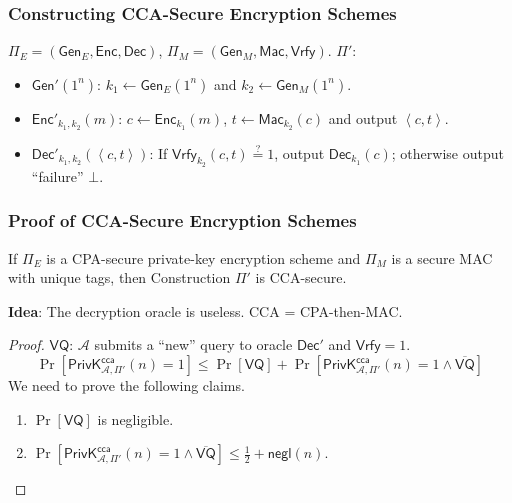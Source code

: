 \begin{frame}\frametitle{Constructing CCA-Secure Encryption Schemes}
\begin{figure}
\begin{center}

\end{center}
\end{figure}
\begin{construction}
$\Pi_E = (\mathsf{Gen}_E, \mathsf{Enc}, \mathsf{Dec})$, $\Pi_M = (\mathsf{Gen}_M, \mathsf{Mac}, \mathsf{Vrfy})$. $\Pi'$:
\begin{itemize}
\item $\mathsf{Gen}'(1^n)$: $k_1 \gets \mathsf{Gen}_E(1^n)$ and $k_2 \gets \mathsf{Gen}_M(1^n)$.
\item $\mathsf{Enc}'_{k_1,k_2}(m)$: $c \gets \mathsf{Enc}_{k_1}(m)$, $t \gets \mathsf{Mac}_{k_2}(c)$ and output $\left< c,t \right>$.
\item $\mathsf{Dec}'_{k_1,k_2}(\left< c,t \right>)$: If $\mathsf{Vrfy}_{k_2}(c,t) \overset{?}{=} 1$, output $\mathsf{Dec}_{k_1}(c)$; otherwise output ``failure'' $\bot$.
\end{itemize}
\end{construction}
\end{frame}
\begin{frame}\frametitle{Proof of CCA-Secure Encryption Schemes}
\begin{theorem}
If $\Pi_E$ is a CPA-secure private-key encryption scheme and $\Pi_M$ is a secure MAC with unique tags, then Construction $\Pi'$ is CCA-secure.
\end{theorem}
\textbf{Idea}: The decryption oracle is useless. CCA = CPA-then-MAC. 
\begin{proof}
$\mathsf{VQ}$: $\mathcal{A}$ submits a ``new'' query to oracle $\mathsf{Dec}'$ and $\mathsf{Vrfy}=1$.
\[ \Pr[\mathsf{PrivK}^{\mathsf{cca}}_{\mathcal{A},\Pi'}(n)=1] \le \Pr[\mathsf{VQ}] + \Pr[\mathsf{PrivK}^{\mathsf{cca}}_{\mathcal{A},\Pi'}(n)=1 \land \overline{\mathsf{VQ}}] \]
We need to prove the following claims.
\begin{enumerate}
\item $\Pr[\mathsf{VQ}]$ is negligible.
\item $\Pr[\mathsf{PrivK}^{\mathsf{cca}}_{\mathcal{A},\Pi'}(n)=1 \land \overline{\mathsf{VQ}}] \le \frac{1}{2} + \mathsf{negl}(n)$. 
\end{enumerate}
\end{proof}
\end{frame}
